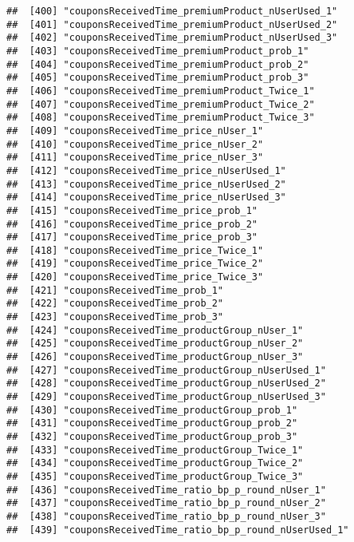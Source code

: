 \documentclass[10pt]{report}
\begin{document}
\begin{verbatim}
##  [400] "couponsReceivedTime_premiumProduct_nUserUsed_1"       
##  [401] "couponsReceivedTime_premiumProduct_nUserUsed_2"       
##  [402] "couponsReceivedTime_premiumProduct_nUserUsed_3"       
##  [403] "couponsReceivedTime_premiumProduct_prob_1"            
##  [404] "couponsReceivedTime_premiumProduct_prob_2"            
##  [405] "couponsReceivedTime_premiumProduct_prob_3"            
##  [406] "couponsReceivedTime_premiumProduct_Twice_1"           
##  [407] "couponsReceivedTime_premiumProduct_Twice_2"           
##  [408] "couponsReceivedTime_premiumProduct_Twice_3"           
##  [409] "couponsReceivedTime_price_nUser_1"                    
##  [410] "couponsReceivedTime_price_nUser_2"                    
##  [411] "couponsReceivedTime_price_nUser_3"                    
##  [412] "couponsReceivedTime_price_nUserUsed_1"                
##  [413] "couponsReceivedTime_price_nUserUsed_2"                
##  [414] "couponsReceivedTime_price_nUserUsed_3"                
##  [415] "couponsReceivedTime_price_prob_1"                     
##  [416] "couponsReceivedTime_price_prob_2"                     
##  [417] "couponsReceivedTime_price_prob_3"                     
##  [418] "couponsReceivedTime_price_Twice_1"                    
##  [419] "couponsReceivedTime_price_Twice_2"                    
##  [420] "couponsReceivedTime_price_Twice_3"                    
##  [421] "couponsReceivedTime_prob_1"                           
##  [422] "couponsReceivedTime_prob_2"                           
##  [423] "couponsReceivedTime_prob_3"                           
##  [424] "couponsReceivedTime_productGroup_nUser_1"             
##  [425] "couponsReceivedTime_productGroup_nUser_2"             
##  [426] "couponsReceivedTime_productGroup_nUser_3"             
##  [427] "couponsReceivedTime_productGroup_nUserUsed_1"         
##  [428] "couponsReceivedTime_productGroup_nUserUsed_2"         
##  [429] "couponsReceivedTime_productGroup_nUserUsed_3"         
##  [430] "couponsReceivedTime_productGroup_prob_1"              
##  [431] "couponsReceivedTime_productGroup_prob_2"              
##  [432] "couponsReceivedTime_productGroup_prob_3"              
##  [433] "couponsReceivedTime_productGroup_Twice_1"             
##  [434] "couponsReceivedTime_productGroup_Twice_2"             
##  [435] "couponsReceivedTime_productGroup_Twice_3"             
##  [436] "couponsReceivedTime_ratio_bp_p_round_nUser_1"         
##  [437] "couponsReceivedTime_ratio_bp_p_round_nUser_2"         
##  [438] "couponsReceivedTime_ratio_bp_p_round_nUser_3"         
##  [439] "couponsReceivedTime_ratio_bp_p_round_nUserUsed_1"     

\end{verbatim}
\end{document}

